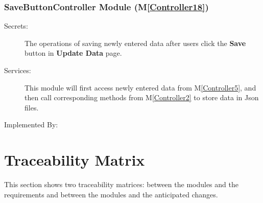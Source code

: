 \documentclass[12pt, titlepage]{article}
\newcommand{\mref}[1]{M\ref{#1}}
\begin{document}
\renewcommand{\bt}{\textbf{Save }}
\subsubsection{SaveButtonController Module (\mref{Controller18})}
\begin{description}
\item[Secrets:] The operations of saving newly entered data after users click the \bt button
 in \textbf{Update Data} page.
\item[Services:] This module will first access newly entered data from \mref{Controller5},
and then call corresponding methods from \mref{Controller2} to store data in Json files.
\item[Implemented By:] \progname{}
\end{description}

\newpage

\section{Traceability Matrix} \label{SecTM}

This section shows two traceability matrices: between the modules and the
requirements and between the modules and the anticipated changes.
\end{document}
